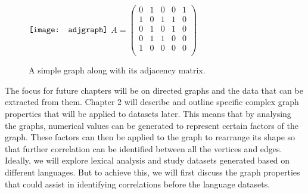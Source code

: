 \begin{figure}[!htb]
\centering
$\vcenter{\hbox{\texttt{[image: adjgraph]}}}$
\hfill
$A = \begin{pmatrix}
0 & 1 & 0 & 0 & 1 \\
1 & 0 & 1 & 1 & 0 \\
0 & 1 & 0 & 1 & 0 \\
0 & 1 & 1 & 0 & 0 \\
1 & 0 & 0 & 0 & 0 \\
\end{pmatrix} $
\caption{A simple graph along with its adjacency matrix.}
\label{fig:Adjacency Graph}
\end{figure}

The focus for future chapters will be on directed graphs and the data that can be extracted from them. Chapter 2 will describe and outline specific complex graph properties that will be applied to datasets later. This means that by analysing the graphs, numerical values can be generated to represent certain factors of the graph. These factors can then be applied to the graph to rearrange its shape so that further correlation can be identified between all the vertices and edges. Ideally, we will explore lexical analysis and study datasets generated based on different languages. But to achieve this, we will first discuss the graph properties that could assist in identifying correlations before the language datasets.